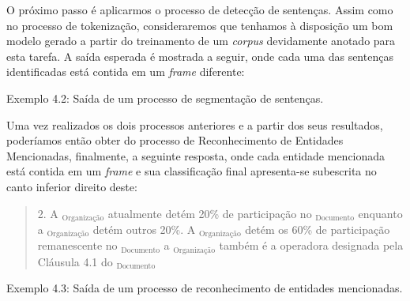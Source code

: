 \documentclass[11pt]{report}
\begin{document}
O próximo passo é aplicarmos o processo de detecção de sentenças. Assim como no processo de tokenização, consideraremos que tenhamos à disposição um bom modelo
gerado a partir do treinamento de um \textit{corpus} devidamente anotado para esta tarefa. A saída esperada é mostrada a seguir, onde cada uma das sentenças identificadas está contida
em um \textit{frame} diferente:

\begin{quote}
\end{quote}

\begin{quote}
\end{quote}

\begin{quote}
\end{quote}

\begin{center}
  Exemplo 4.2: Saída de um processo de segmentação de sentenças.
\end{center}

Uma vez realizados os dois processos anteriores e a partir dos seus resultados, poderíamos então obter do processo de Reconhecimento de Entidades Mencionadas,
finalmente, a seguinte resposta, onde cada entidade mencionada está contida em um \textit{frame} e sua classificação final apresenta-se subescrita no canto inferior direito deste:

\begin{quote}
  \begin{varwidth}{0.95\textwidth}
  2. A $_{\text{Organização}}$ atualmente detém 20\% de participação no $_{\text{Documento}}$ enquanto a $_{\text{Organização}}$
  detém outros 20\%. A $_{\text{Organização}}$ detém os 60\% de participação remanescente no $_{\text{Documento}}$ a
  $_{\text{Organização}}$ também é a operadora designada pela Cláusula 4.1 do $_{\text{Documento}}$
  \end{varwidth}
\end{quote}
\begin{center}
  Exemplo 4.3: Saída de um processo de reconhecimento de entidades mencionadas.
\end{center}
\end{document}
